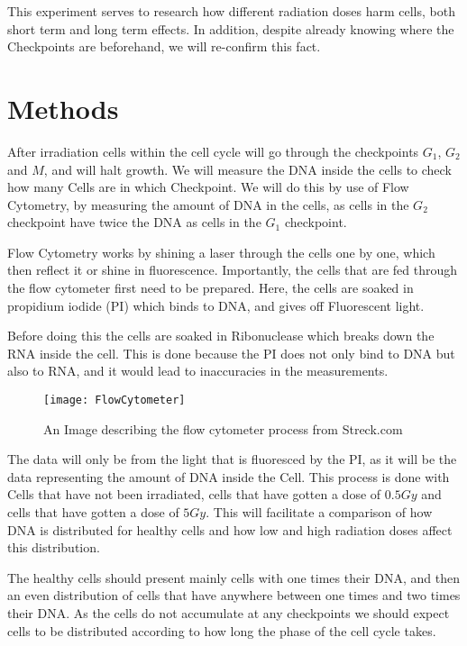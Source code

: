 \documentclass[]{scrartcl}
\begin{document}
This experiment serves to research how different radiation doses harm cells, both short term and long term effects. In addition, despite already knowing where the Checkpoints are beforehand, we will re-confirm this fact.
\newpage
\section{Methods}

After irradiation cells within the cell cycle will go through the checkpoints $G_1$, $G_2$ and $M$, and will halt growth. We will measure the DNA inside the cells to check how many Cells are in which Checkpoint. We will do this by use of Flow Cytometry, by measuring the amount of DNA in the cells, as cells in the $G_2$ checkpoint have twice the DNA as cells in the $G_1$ checkpoint.

Flow Cytometry works by shining a laser through the cells one by one, which then reflect it or shine in fluorescence. Importantly, the cells that are fed through the flow cytometer first need to be prepared. Here, the cells are soaked in propidium iodide (PI) which binds to DNA, and gives off Fluorescent light.

Before doing this the cells are soaked in Ribonuclease which breaks down the RNA inside the cell. This is done because the PI does not only bind to DNA but also to RNA, and it would lead to inaccuracies in the measurements.
\begin{center}
	\begin{figure}[h!]
	\texttt{[image: FlowCytometer]}
	\caption{An Image describing the flow cytometer process from Streck.com}
	\end{figure}
\end{center}
The data will only be from the light that is fluoresced by the PI, as it will be the data representing the amount of DNA inside the Cell. This process is done with Cells that have not been irradiated, cells that have gotten a dose of $0.5 Gy$ and cells that have gotten a dose of $5 Gy$. This will facilitate a comparison of how DNA is distributed for healthy cells and how low and high radiation doses affect this distribution. 

The healthy cells should present mainly cells with one times their DNA, and then an even distribution of cells that have anywhere between one times and two times their DNA. As the cells do not accumulate at any checkpoints we should expect cells to be distributed according to how long the phase of the cell cycle takes.
\end{document}
